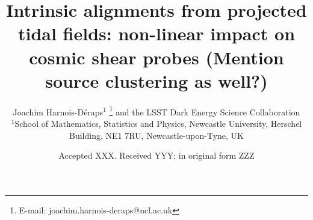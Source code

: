 \documentclass[useAMS,usenatbib]{mn2e}
\title[Lensing beyond 2pt: accounting for IA]{Intrinsic alignments from projected tidal fields: non-linear  impact on cosmic shear probes (Mention source clustering as well?)}
\author[J. Harnois-D\'{e}raps et al.]{Joachim Harnois-D\'{e}raps$^{1}$
\thanks{E-mail: joachim.harnois-deraps@ncl.ac.uk}
\newauthor
and the LSST Dark Energy Science Collaboration
\\
$^{1}$School of Mathematics, Statistics and Physics, Newcastle University, Herschel Building, NE1 7RU, Newcastle-upon-Tyne, UK\\
}
\date{Accepted XXX. Received YYY; in original form ZZZ}
\begin{document}
\label{firstpage}
\maketitle





 










%

 




\bsp	%
\label{lastpage}
\end{document}
